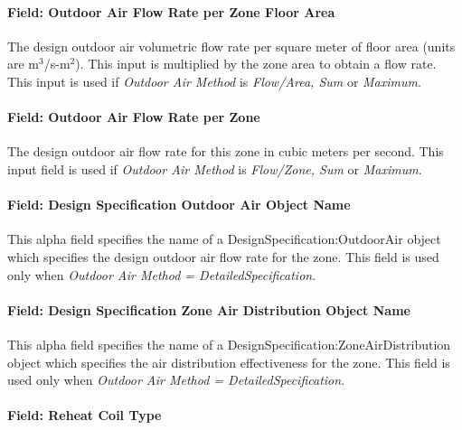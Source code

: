 \paragraph{Field: Outdoor Air Flow Rate per Zone Floor Area}\label{field-outdoor-air-flow-rate-per-zone-floor-area-11}

The design outdoor air volumetric flow rate per square meter of floor area (units are m\(^{3}\)/s-m\(^{2}\)). This input is multiplied by the zone area to obtain a flow rate. This input is used if \emph{Outdoor Air Method} is \emph{Flow/Area, Sum} or \emph{Maximum}.

\paragraph{Field: Outdoor Air Flow Rate per Zone}\label{field-outdoor-air-flow-rate-per-zone-11}

The design outdoor air flow rate for this zone in cubic meters per second. This input field is used if \emph{Outdoor Air Method} is \emph{Flow/Zone, Sum} or \emph{Maximum}.

\paragraph{Field: Design Specification Outdoor Air Object Name}\label{field-design-specification-outdoor-air-object-name-9}

This alpha field specifies the name of a DesignSpecification:OutdoorAir object which specifies the design outdoor air flow rate for the zone. This field is used only when \emph{Outdoor Air Method = DetailedSpecification}.

\paragraph{Field: Design Specification Zone Air Distribution Object Name}\label{field-design-specification-zone-air-distribution-object-name-10}

This alpha field specifies the name of a DesignSpecification:ZoneAirDistribution object which specifies the air distribution effectiveness for the zone. This field is used only when \emph{Outdoor Air Method = DetailedSpecification}.

\paragraph{Field: Reheat Coil Type}\label{field-reheat-coil-type-3}

